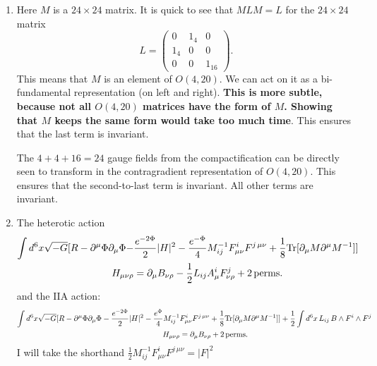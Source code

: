 \documentclass[11pt, class=article, crop=false]{standalone}
\begin{document}
\begin{enumerate}
	 The anomaly cancelation term usually takes the form:
	 \[
	 	\int C \wedge I_8
	 \]
	 Note the suggestive way $I_8$ is written in equation \eqref{eq:I8}.
	Because we have seen that $G \propto I_4$ on the boundary, the Chern-Simons term $C \wedge G \wedge G$ on the boundary reduces to $C \wedge I_4^2$. This is a part of $I_8$. We thus expect the remaining part to take the form:
	\[
		\frac{\sqrt{2}}{(4 \pi)^3 (4 \pi \kappa^2)^{1/3}} \int C \wedge \left(-\frac18 R^4 + \frac{1}{32} (\tr R^2)^2 \right)
	\]
	Again, this is a purely quantum effect of M-theory. 
	
	\item Here $M$ is a $24 \times 24$ matrix. It is quick to see that $M L M = L$ for the $24 \times 24$ matrix 
	\[
		L = \begin{pmatrix}
			0 & 1_4 & 0\\
			1_4 & 0 & 0\\
			0 & 0 & 1_{16}
		\end{pmatrix}.
	\]
	This means that $M$ is an element of $O(4,20)$. We can act on it as a bi-fundamental representation (on left and right). \textbf{This is more subtle, because not all $O(4, 20)$ matrices have the form of $M$. Showing that $M$ keeps the same form would take too much time}.  This ensures that the last term is invariant.
	
	The $4+4+16 = 24$ gauge fields from the compactification can be directly seen to transform in the contragradient representation of $O(4,20)$. This ensures that the second-to-last term is invariant. All other terms are invariant.
	
	\item The heterotic action
	\[
	\begin{aligned}
		\int d^6 x \sqrt{-G} [R - \partial^\mu \Phi \partial_\mu \Phi - &\frac{e^{-2 \Phi}}{2} |H|^2 - \frac{e^{-\Phi}}{4} M^{-1}_{ij} F^i_{\mu \nu} F^{j\, \mu \nu} + \frac18 \mathrm{Tr}[\partial_\mu M \partial^\mu M^{-1}]]\\
		 H_{\mu \nu \rho} &= \partial_\mu B_{\nu \rho} - \frac12 L_{ij} A^i_\mu F^j_{\nu \rho} + 2 \,\mathrm{perms.}
	\end{aligned}
	\]
	and the IIA action:
	\[
	\begin{aligned}
		\int d^6 x \sqrt{-G} [R - \partial^\mu \Phi \partial_\mu \Phi - \frac{e^{-2 \Phi}}{2} |H|^2 - \frac{e^{\Phi}}{4} M^{-1}_{ij}& F^i_{\mu \nu} F^{j\, \mu \nu} + \frac18 \mathrm{Tr}[\partial_\mu M \partial^\mu M^{-1}]] + \frac12 \int d^6 x \, L_{ij}\, B \wedge F^i \wedge F^j
		 \\
		 \quad H_{\mu \nu \rho} &= \partial_\mu B_{\nu \rho} + 2 \,\mathrm{perms.}
	\end{aligned}
	\]
	I will take the shorthand $\frac12 M^{-1}_{ij} F^i_{\mu \nu} F^{j\, \mu \nu} = |F|^2$
	

\end{enumerate}
\end{document}
